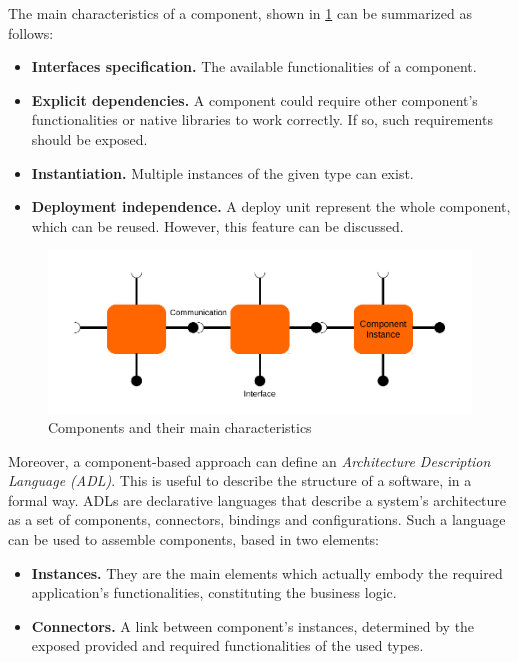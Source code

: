 The main characteristics of a component, shown in \ref{fig:CBSE} can be summarized as follows:
\begin{itemize}
	\item \textbf{Interfaces specification.} The available functionalities of a component.
	\item \textbf{Explicit dependencies.} A component could require other component's functionalities or native libraries to work correctly.
	If so, such requirements should be exposed.
	\item \textbf{Instantiation.} Multiple instances of the given type can exist.
	\item \textbf{Deployment independence.} A deploy unit represent the whole component, which can be reused. However, this feature can be discussed.
\end{itemize}

\begin{figure}[htb]
	\centering
	\includegraphics[width=1\columnwidth]{chapters/stateOfTheArt.images/CBSE.pdf}
	\caption{Components and their main characteristics}
	\label{fig:CBSE}
\end{figure}

Moreover, a component-based approach can define an \textit{Architecture Description Language (ADL)}.
This is useful to describe the structure of a software, in a formal way\cite{taylor2009architectural}\cite{len2003software}\cite{medvidovic2000classification}.
ADLs are declarative languages that describe a system's architecture as a set of components, connectors, bindings and configurations.
Such a language can be used to assemble components, based in two elements:

\begin{itemize}
	\item \textbf{Instances.} They are the main elements which actually embody the required application's functionalities, constituting the business logic.
	\item \textbf{Connectors.} A link between component's instances, determined by the exposed provided and required functionalities of the used types.
\end{itemize}

